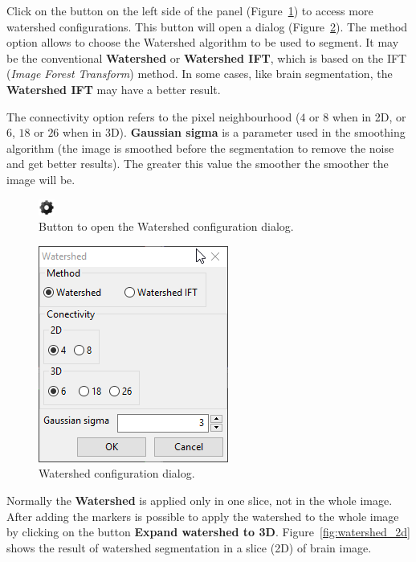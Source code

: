 Click on the button on the left side of the panel (Figure~\ref{fig:watershed_conf}) to access more watershed configurations. This button will open a dialog (Figure~\ref{fig:watershed_janela_conf}). The method option allows to choose the Watershed algorithm to be used to segment. It may be the conventional \textbf{Watershed} or \textbf{Watershed IFT}, which is based on the IFT (\textit{Image Forest Transform}) method. In some cases, like brain segmentation, the \textbf{Watershed IFT} may have a better result.

The connectivity option refers to the pixel neighbourhood ($4$ or $8$ when in 2D,  or $6$, $18$ or $26$ when in 3D). \textbf{Gaussian sigma} is a parameter used in the smoothing algorithm (the image is smoothed before the segmentation to remove the noise and get better results). The greater this value the smoother the smoother the image will be.

\begin{figure}[!htb]
    \centering
    \includegraphics[scale=0.5]{../user_guide_figures/icons/configuration.png}
    \caption{Button to open the Watershed configuration dialog.}
    \label{fig:watershed_conf}
\end{figure}

\begin{figure}[!htb]
    \centering
    \includegraphics[scale=0.55]{../user_guide_figures/invesalius_screen/segmentation_watershed_conf_en.png}
    \caption{Watershed configuration dialog.}
    \label{fig:watershed_janela_conf}
\end{figure}

Normally the \textbf{Watershed} is applied only in one slice, not in the whole image. After adding the markers is possible to apply the watershed to the whole image by clicking on the button \textbf{Expand watershed to 3D}. Figure~\ref{fig:watershed_2d} shows the result of watershed segmentation in a slice (2D) of brain image. 

